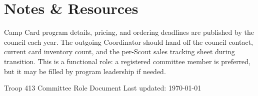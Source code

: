 \documentclass[11pt, letterpaper]{article}
\begin{document}
\vspace{0.6em}

\section{Notes \& Resources}
Camp Card program details, pricing, and ordering deadlines are published by the council each year. The outgoing Coordinator should hand off the council contact, current card inventory count, and the per-Scout sales tracking sheet during transition. This is a functional role: a registered committee member is preferred, but it may be filled by program leadership if needed.

\vfill
\begin{center}
  \footnotesize\color{gray}
  Troop 413 \textbullet{} Committee Role Document \textbullet{} Last updated: \today
\end{center}
\end{document}
